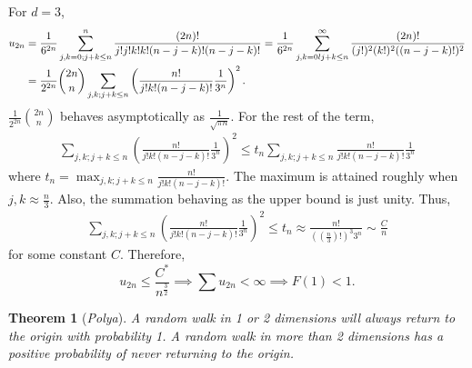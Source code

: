 \documentclass[15pt,a4paper]{book}
\newtheorem{theorem}{Theorem}[chapter]
\theoremstyle{definition}
\newcommand{\eax}[1]{\emph{#1}\index{#1}} %
\begin{document}
For $d = 3$,
\begin{align}
    u_{2n} &= \frac{1}{6^{2n}} \sum_{j,k = 0; j+k \leq n}^{n} \frac{(2n)!}{j! j! k! k! (n-j-k)! (n-j-k)!} = \frac{1}{6^{2n}} \sum_{j,k=0l j+k \leq n}^{\infty} \frac{(2n)!}{(j!)^{2}(k!)^{2}((n-j-k)!)^{2}} \notag \\
    &= \frac{1}{2^{2n}} \binom{2n}{n} \sum_{j,k;j+k \leq n} \left( \frac{n!}{j!k!(n-j-k)!} \frac{1}{3^{n}} \right)^{2}.
\end{align}
$\frac{1}{2^{2n}} \binom{2n}{n}$ behaves asymptotically as $\frac{1}{\sqrt{\pi n}}$. For the rest of the term,
\begin{align}
    \sum_{j,k; j+k \leq n} \left( \frac{n!}{j!k!(n-j-k)!} \frac{1}{3^{n}} \right)^{2} \leq t_{n} \sum_{j,k;j+k \leq n} \frac{n!}{j!k!(n-j-k)!} \frac{1}{3^{n}}
\end{align}
where $t_{n} = \max_{j,k;j+k \leq n} \frac{n!}{j!k!(n-j-k)!}$. The maximum is attained roughly when $j,k \approx \frac{n}{3}$. Also, the summation behaving as the upper bound is just unity. Thus,
\begin{align}
    \sum_{j,k; j+k \leq n} \left( \frac{n!}{j!k!(n-j-k)!} \frac{1}{3^{n}} \right)^{2} \leq t_{n} \approx \frac{n!}{((\frac{n}{3})!)^{3} 3^{n}} \sim \frac{C}{n}
\end{align}
for some constant $C$. Therefore,
\begin{equation}
    u_{2n} \leq \frac{C^{\ast}}{n^{\frac{3}{2}}} \implies \sum u_{2n} < \infty \implies F(1) < 1.
\end{equation}

\begin{theorem}[\eax{Polya}]
    A random walk in 1 or 2 dimensions will always return to the origin with probability 1. A random walk in more than 2 dimensions has a positive probability of never returning to the origin.
\end{theorem}

\end{document}

